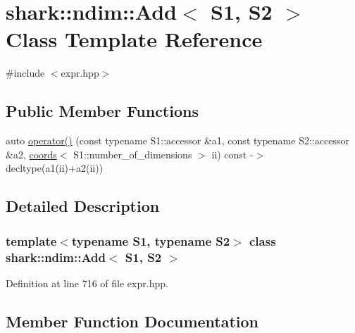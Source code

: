 \hypertarget{classshark_1_1ndim_1_1_add}{}\section{shark\+:\+:ndim\+:\+:Add$<$ S1, S2 $>$ Class Template Reference}
\label{classshark_1_1ndim_1_1_add}


{\ttfamily \#include $<$expr.\+hpp$>$}

\subsection*{Public Member Functions}
\begin{DoxyCompactItemize}
\item 
auto \hyperlink{classshark_1_1ndim_1_1_add_a762a1116289199ba822704a997ef51d5}{operator()} (const typename S1\+::accessor \&a1, const typename S2\+::accessor \&a2, \hyperlink{structshark_1_1ndim_1_1coords}{coords}$<$ S1\+::number\+\_\+of\+\_\+dimensions $>$ ii) const -\/$>$ decltype(a1(ii)+a2(ii))
\end{DoxyCompactItemize}


\subsection{Detailed Description}
\subsubsection*{template$<$typename S1, typename S2$>$\newline
class shark\+::ndim\+::\+Add$<$ S1, S2 $>$}



Definition at line 716 of file expr.\+hpp.



\subsection{Member Function Documentation}
\hypertarget{classshark_1_1ndim_1_1_add_a762a1116289199ba822704a997ef51d5}{}\label{classshark_1_1ndim_1_1_add_a762a1116289199ba822704a997ef51d5} 
